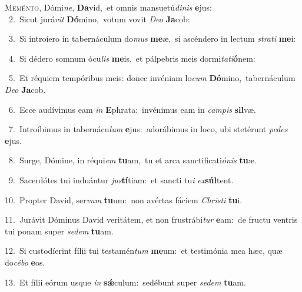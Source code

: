 \lettrine{\initial\textcolor{\initialcolor}{M}}{eménto,} Dómi\-\textit{ne}\-, \textbf{Da}\-vid,~\star et omnis mansuetú\-\textit{di}\-\textit{nis} \textbf{e}\-jus:\\
{\numbfont\textcolor{\numbcolor}{~2.}}~Sicut jurá\textit{vit} \textbf{Dó}\-mino,~\star votum vovit \textit{De}\-\textit{o} \textbf{Ja}\-cob:\par
{\numbfont\textcolor{\numbcolor}{~3.}}~Si introíero in tabernáculum do\textit{mus} \textbf{me}\-æ,~\star si ascéndero in lectum \textit{stra}\-\textit{ti} \textbf{me}\-i:\par
{\numbfont\textcolor{\numbcolor}{~4.}}~Si dédero somnum ócu\textit{lis} \textbf{me}\-is,~\star et pálpebris meis dormi\-\textit{ta}\-\textit{ti}\textbf{ó}nem:\par
{\numbfont\textcolor{\numbcolor}{~5.}}~Et réquiem tempóribus meis: donec invéniam lo\textit{cum} \textbf{Dó}\-mino,~\star tabernáculum \textit{De}\-\textit{o} \textbf{Ja}\-cob.\par
{\numbfont\textcolor{\numbcolor}{~6.}}~Ecce audívimus eam \textit{in} \textbf{E}\-phrata:~\star invénimus eam in \textit{cam}\-\textit{pis} \textbf{sil}\-væ.\par
{\numbfont\textcolor{\numbcolor}{~7.}}~Introíbimus in tabernácu\textit{lum} \textbf{e}\-jus:~\star adorábimus in loco, ubi stetérunt \textit{pe}\-\textit{des} \textbf{e}\-jus.\par
{\numbfont\textcolor{\numbcolor}{~8.}}~Surge, Dómine, in réqui\textit{em} \textbf{tu}\-am,~\star tu et arca sanctificati\-\textit{ó}\-\textit{nis} \textbf{tu}\-æ.\par
{\numbfont\textcolor{\numbcolor}{~9.}}~Sacerdótes tui induántur \textit{jus}\-\textbf{tí}tiam:~\star et sancti tu\textit{i} \textit{ex}\-\textbf{súl}tent.\par
{\numbfont\textcolor{\numbcolor}{10.}}~Propter David, ser\textit{vum} \textbf{tu}\-um:~\star non avértas fáciem \textit{Chris}\-\textit{ti} \textbf{tu}\-i.\par
{\numbfont\textcolor{\numbcolor}{11.}}~Jurávit Dóminus David veritátem, et non frustrábi\textit{tur} \textbf{e}\-am:~\star de fructu ventris tui ponam super \textit{se}\-\textit{dem} \textbf{tu}\-am.\par
{\numbfont\textcolor{\numbcolor}{12.}}~Si custodíerint fílii tui testamén\textit{tum} \textbf{me}\-um:~\star et testimónia mea hæc, quæ do\-\textit{cé}\-\textit{bo} \textbf{e}\-os.\par
{\numbfont\textcolor{\numbcolor}{13.}}~Et fílii eórum usque \textit{in} \textbf{sǽ}\-culum:~\star sedébunt super \textit{se}\-\textit{dem} \textbf{tu}\-am.\par
